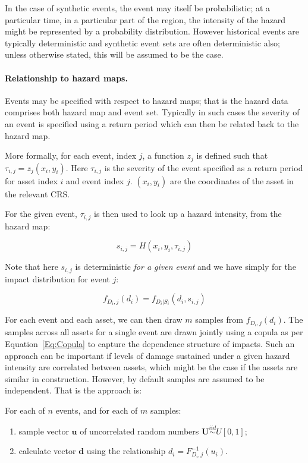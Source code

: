 \documentclass[a4paper,11pt]{extarticle} %
\begin{document}
In the case of synthetic events, the event may itself be probabilistic; at a particular time, in a particular part of the region, the intensity of the hazard might be represented by a probability distribution. However historical events are typically deterministic and synthetic event sets are often deterministic also; unless otherwise stated, this will be assumed to be the case.

\paragraph{Relationship to hazard maps.}
Events may be specified with respect to hazard maps; that is the hazard data comprises both hazard map and event set. Typically in such cases the severity of an event is specified using a return period which can then be related back to the hazard map.

More formally, for each event, index $j$, a function $z_j$ is defined such that $\tau_{i, j} = z_j(x_i, y_i)$. Here $\tau_{i, j}$ is the severity of the event specified as a return period for asset index $i$ and event index $j$.  $(x_i, y_i)$ are the coordinates of the asset in the relevant CRS.

For the given event, $\tau_{i, j}$ is then used to look up a hazard intensity, from the hazard map:

 \begin{equation}
    \label{Eq:Severity1}
    s_{i, j} = H(x_i, y_i, \tau_{i, j})
\end{equation}

Note that here $s_{i, j}$ is deterministic \emph{for a given event} and we have simply for the impact distribution for event $j$:

 \begin{equation}
    \label{Eq:Severity2}
    f_{D_i, j}(d_i) = f_{D_i|S_i}(d_i, s_{i, j})
\end{equation}

For each event and each asset, we can then draw $m$ samples from $f_{D_i, j}(d_i)$. The samples across all assets for a single event are drawn jointly using a copula as per Equation~\ref{Eq:Copula} to capture the dependence structure of impacts. Such an approach can be important if levels of damage sustained under a given hazard intensity are correlated between assets, which might be the case if the assets are similar in construction. However, by default samples are assumed to be independent. That is the approach is:

For each of $n$ events, and for each of $m$ samples:
\begin{enumerate}[]
    \item sample vector $\mathbf{u}$ of uncorrelated random numbers $\mathbf{U} \stackrel{iid}{\sim} U[0, 1]$;
    \item calculate vector $\mathbf{d}$ using the relationship $d_i = F_{D_i, j}^{-1}(u_i)$.
\end{enumerate}
\end{document}
